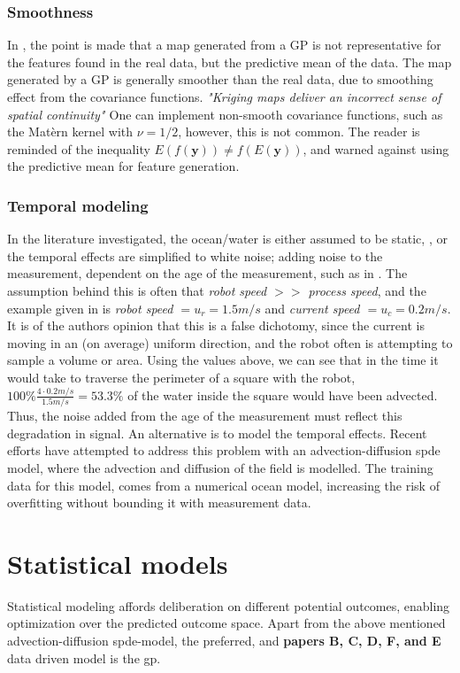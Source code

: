 \subsubsection*{Smoothness}
In \cite{eidsvik2015value}, the point is made that a map generated from a GP is not representative for the features found in the real data, but the predictive mean of the data. The map generated by a GP is generally smoother than the real data, due to smoothing effect from the covariance functions. \textit{"Kriging maps deliver an incorrect sense of spatial continuity" \cite{eidsvik2015value}} One can implement non-smooth covariance functions, such as the Matèrn kernel with $\nu=1/2$, however, this is not common. The reader is reminded of the inequality $E(f(\mathbf{y})) \neq f(E(\mathbf{y}))$, and warned against using the predictive mean for feature generation. 

\subsubsection*{Temporal modeling}
In the literature investigated, the ocean/water is either assumed to be static, \textcite{kemna2018multi,stankiewicz2021adaptive}, or the temporal effects are simplified to white noise; adding noise to the measurement, dependent on the age of the measurement, such as in \textcite{fossum2019adaptive}. The assumption behind this is often that \textit{robot speed $>>$ process speed}, and the example given in \textcite{fossum2018information} is \textit{robot speed $= u_r = 1.5m/s$} and \textit{current speed $ = u_c = 0.2 m/s$}. It is of the authors opinion that this is a false dichotomy, since the current is moving in an (on average) uniform direction, and the robot often is attempting to sample a volume or area. Using the values above, we can see that in the time it would take to traverse the perimeter of a square with the robot, $100\% \frac{4\cdot0.2 m/s}{1.5 m/s} = 53.3\%$ of the water inside the square would have been advected. Thus, the noise added from the age of the measurement must reflect this degradation in signal. An alternative is to model the temporal effects. Recent efforts \cite{berget2022adaptive} have attempted to address this problem with an advection-diffusion \acrfull{spde} model, where the advection  and diffusion of the field is modelled. The training data for this model, comes from a numerical ocean model, increasing the risk of overfitting without bounding it with measurement data. 

\section{Statistical models}
Statistical modeling affords deliberation on different potential outcomes, enabling optimization over the predicted outcome space. Apart from the above mentioned advection-diffusion \acrshort{spde}-model, the preferred\cite{low2009multi,kemna2016adaptive,kemna2018multi,fossum2018information,fossum2019toward,stankiewicz2021adaptive,berget2018adaptive}, and \textbf{papers B, C, D, F, and E} data driven model is the \acrfull{gp}. 

